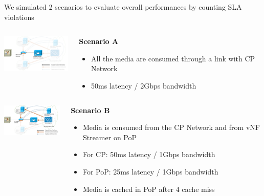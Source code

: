 \documentclass[a4paper]{beamer}
\begin{document}
\begin{frame}{We simulated 2 scenarios to evaluate overall performances by counting SLA violations}
	
			

		\begin{columns}[T]
		\begin{column}[T]{0.33 \textwidth} 
			
			\includegraphics[width=10em]{highleveldesign1.png}
		\end{column}
										
		\begin{column}[T]{0.66\textwidth} 
										  
			\textbf{Scenario A}
			\begin{itemize}
				\item All the media are consumed through a link with CP Network
				\item 50ms latency / 2Gbps bandwidth
			\end{itemize}
			\vspace{3mm}
			
		\end{column}
																										
	\end{columns}
	
		\begin{columns}[T]
		\begin{column}[T]{0.33 \textwidth} 
		\vspace{2em}
			\includegraphics[width=10em]{highleveldesign7bis.png}
		\end{column}
										
		\begin{column}[T]{0.66\textwidth} 
										  
			\textbf{Scenario B}
			\begin{itemize}
				\item Media is consumed from the CP Network and from vNF Streamer on PoP
				\item For CP: 50ms latency / 1Gbps bandwidth
				\item For PoP: 25ms latency / 1Gbps bandwidth
				\item Media is cached in PoP after 4 cache miss
			\end{itemize}
			
		\end{column}
																										
	\end{columns}
	
	
	
\end{frame}
\end{document}
